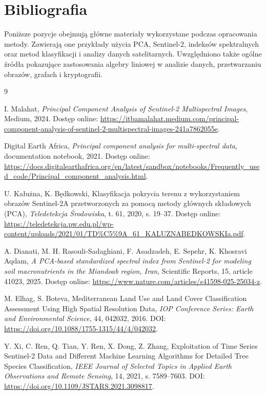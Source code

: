 \documentclass[12pt,a4paper]{article}
\begin{document}
\section{Bibliografia}
\label{sec:bibliografia}

Poniższe pozycje obejmują główne materiały wykorzystane podczas opracowania metody. Zawierają one przykłady użycia PCA, Sentinel-2, indeksów spektralnych oraz metod klasyfikacji i analizy danych satelitarnych. Uwzględniono także ogólne źródła pokazujące zastosowania algebry liniowej w analizie danych, przetwarzaniu obrazów, grafach i kryptografii.

\begin{thebibliography}{9}

I. Malahat, \textit{Principal Component Analysis of Sentinel-2 Multispectral Images}, Medium, 2024. Dostęp online: \url{https://itbamalahat.medium.com/principal-component-analysis-of-sentinel-2-multispectral-images-241a7862055e}.

Digital Earth Africa, \textit{Principal component analysis for multi-spectral data}, documentation notebook, 2021. Dostęp online: \url{https://docs.digitalearthafrica.org/en/latest/sandbox/notebooks/Frequently_used_code/Principal_component_analysis.html}.

U. Kałużna, K. Będkowski, Klasyfikacja pokrycia terenu z wykorzystaniem obrazów Sentinel-2A przetworzonych za pomocą metody głównych składowych (PCA), \textit{Teledetekcja Środowiska}, t. 61, 2020, s. 19--37. Dostęp online: \url{https://teledetekcja.pw.edu.pl/wp-content/uploads/2021/01/TD%C5%9A_61_KALUZNABEDKOWSKIa.pdf}.

A. Dianati, M. H. Rasouli-Sadaghiani, F. Asadzadeh, E. Sepehr, K. Khosravi Aqdam, \textit{A PCA-based standardized spectral index from Sentinel-2 for modeling soil macronutrients in the Miandoab region, Iran}, Scientific Reports, 15, article 41023, 2025. Dostęp online: \url{https://www.nature.com/articles/s41598-025-25034-z}.

M. Elhag, S. Boteva, Mediterranean Land Use and Land Cover Classification Assessment Using High Spatial Resolution Data, \textit{IOP Conference Series: Earth and Environmental Science}, 44, 042032, 2016. DOI: \url{https://doi.org/10.1088/1755-1315/44/4/042032}.

Y. Xi, C. Ren, Q. Tian, Y. Ren, X. Dong, Z. Zhang, Exploitation of Time Series Sentinel-2 Data and Different Machine Learning Algorithms for Detailed Tree Species Classification, \textit{IEEE Journal of Selected Topics in Applied Earth Observations and Remote Sensing}, 14, 2021, s. 7589--7603. DOI: \url{https://doi.org/10.1109/JSTARS.2021.3098817}.


\end{thebibliography}
\end{document}
